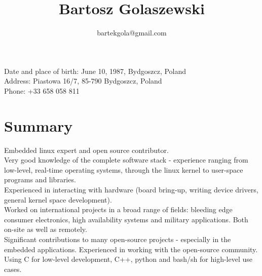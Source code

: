 \documentclass[10pt]{article}
\title{\bfseries\Huge Bartosz Golaszewski}
\author{bartekgola@gmail.com}
\date{}
\begin{document}
	\begin{minipage}{0.65\textwidth}
		\begingroup
		\let\center\flushleft
		\let\endcenter\endflushleft
		\maketitle
		\endgroup
	\end{minipage}
	\begin{minipage}{0.3\textwidth}
	\end{minipage}
	\vspace{2em}
	\linebreak
	\begin{minipage}[ht]{0.68\textwidth}
		Date and place of birth: June 10, 1987, Bydgoszcz, Poland\\
		Address: Piastowa 16/7, 85-790 Bydgoszcz, Poland\\
		Phone: +33 658 058 811
	\end{minipage}

	\vspace{20pt}

\section*{Summary}
Embedded linux expert and open source contributor.\\

Very good knowledge of the complete software stack - experience ranging from low-level, real-time
operating systems, through the linux kernel to user-space programs and libraries.\\

Experienced in interacting with hardware (board bring-up, writing device drivers, general kernel
space development).\\

Worked on international projects in a broad range of fields: bleeding edge consumer electronics,
high availability systems and military applications. Both on-site as well as remotely.\\

Significant contributions to many open-source projects - especially in the embedded applications.
Experienced in working with the open-source community.\\

Using C for low-level development, C++, python and bash/sh for high-level use cases.\\
\end{document}
